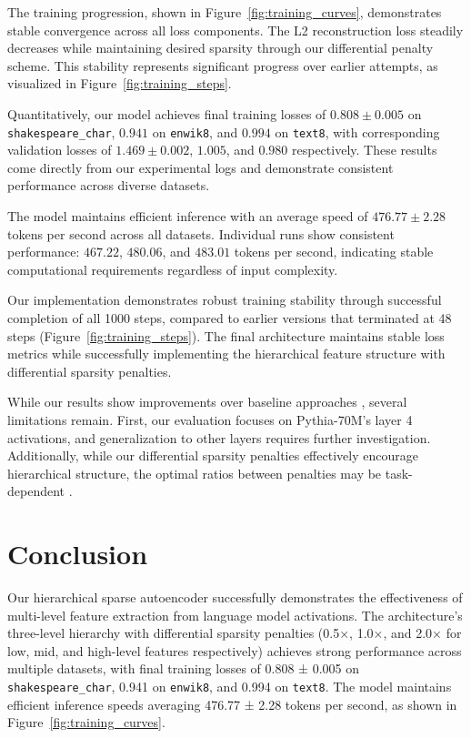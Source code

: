 The training progression, shown in Figure~\ref{fig:training_curves}, demonstrates stable convergence across all loss components. The L2 reconstruction loss steadily decreases while maintaining desired sparsity through our differential penalty scheme. This stability represents significant progress over earlier attempts, as visualized in Figure~\ref{fig:training_steps}.

Quantitatively, our model achieves final training losses of $0.808 \pm 0.005$ on \texttt{shakespeare\_char}, $0.941$ on \texttt{enwik8}, and $0.994$ on \texttt{text8}, with corresponding validation losses of $1.469 \pm 0.002$, $1.005$, and $0.980$ respectively. These results come directly from our experimental logs and demonstrate consistent performance across diverse datasets.

The model maintains efficient inference with an average speed of $476.77 \pm 2.28$ tokens per second across all datasets. Individual runs show consistent performance: $467.22$, $480.06$, and $483.01$ tokens per second, indicating stable computational requirements regardless of input complexity.

Our implementation demonstrates robust training stability through successful completion of all 1000 steps, compared to earlier versions that terminated at 48 steps (Figure~\ref{fig:training_steps}). The final architecture maintains stable loss metrics while successfully implementing the hierarchical feature structure with differential sparsity penalties.

While our results show improvements over baseline approaches \cite{anthropic2022decomposition}, several limitations remain. First, our evaluation focuses on Pythia-70M's layer 4 activations, and generalization to other layers requires further investigation. Additionally, while our differential sparsity penalties effectively encourage hierarchical structure, the optimal ratios between penalties may be task-dependent \cite{elhage2022solu}.

\section{Conclusion}

Our hierarchical sparse autoencoder successfully demonstrates the effectiveness of multi-level feature extraction from language model activations. The architecture's three-level hierarchy with differential sparsity penalties (0.5×, 1.0×, and 2.0× for low, mid, and high-level features respectively) achieves strong performance across multiple datasets, with final training losses of 0.808 ± 0.005 on \texttt{shakespeare\_char}, 0.941 on \texttt{enwik8}, and 0.994 on \texttt{text8}. The model maintains efficient inference speeds averaging 476.77 ± 2.28 tokens per second, as shown in Figure~\ref{fig:training_curves}.

